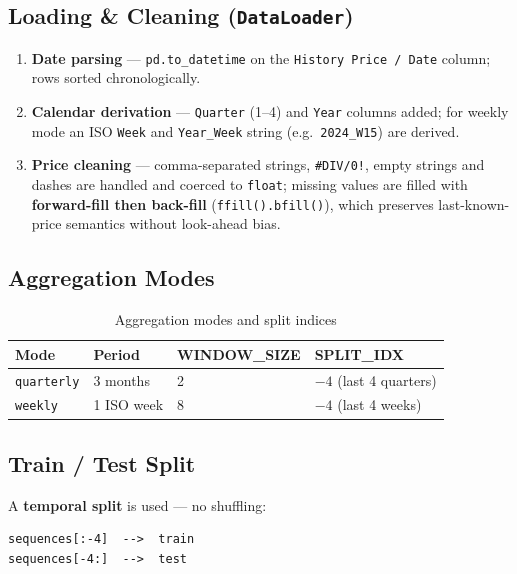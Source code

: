 \documentclass[12pt,a4paper]{article}
\newcommand{\codeinline}[1]{\texttt{\small #1}}
\begin{document}
\subsection{Loading \& Cleaning (\texttt{DataLoader})}
\begin{enumerate}[leftmargin=2em]
  \item \textbf{Date parsing} — \codeinline{pd.to\_datetime} on the \codeinline{History Price / Date} column; rows sorted chronologically.
  \item \textbf{Calendar derivation} — \codeinline{Quarter} (1–4) and \codeinline{Year} columns added; for weekly mode an ISO \codeinline{Week} and \codeinline{Year\_Week} string (e.g.\ \codeinline{2024\_W15}) are derived.
  \item \textbf{Price cleaning} — comma-separated strings, \codeinline{\#DIV/0!}, empty strings and dashes are handled and coerced to \codeinline{float}; missing values are filled with \textbf{forward-fill then back-fill} (\codeinline{ffill().bfill()}), which preserves last-known-price semantics without look-ahead bias.
\end{enumerate}

\subsection{Aggregation Modes}

\begin{table}[H]
\centering
\begin{tabular}{L{2.5cm} L{2.5cm} C{2.5cm} C{3cm}}
\toprule
\textbf{Mode} & \textbf{Period} & \textbf{WINDOW\_SIZE} & \textbf{SPLIT\_IDX} \\
\midrule
\codeinline{quarterly} & 3 months  & 2 & $-4$ (last 4 quarters) \\
\codeinline{weekly}    & 1 ISO week & 8 & $-4$ (last 4 weeks) \\
\bottomrule
\end{tabular}
\caption{Aggregation modes and split indices}
\end{table}

\subsection{Train / Test Split}
A \textbf{temporal split} is used — no shuffling:

\begin{lstlisting}
sequences[:-4]  -->  train
sequences[-4:]  -->  test
\end{lstlisting}
\end{document}
